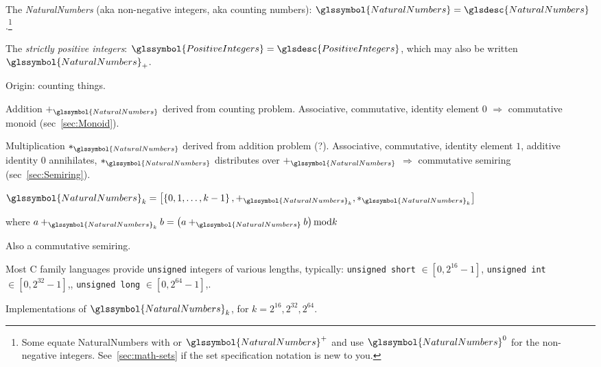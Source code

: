 The \textit{\gls{NaturalNumbers}} 
(aka non-negative integers, aka counting
numbers):\label{NaturalNumbers}
$\glssymbol{NaturalNumbers} = 
\glsdesc{NaturalNumbers}$.\footnote{ 
Some
equate \gls{NaturalNumbers} with  
or $\glssymbol{NaturalNumbers}^{+}$ and use
$\glssymbol{NaturalNumbers}^{0}$ for the non-negative integers. 
See~\autoref{sec:math-sets} if the set specification
notation is new to you.}

The \textit{strictly positive integers}: 
$\glssymbol{PositiveIntegers} = \glsdesc{PositiveIntegers}$, which 
may also be written $\glssymbol{NaturalNumbers}_{+}$.

Origin: counting things.

Addition $+_{\glssymbol{NaturalNumbers}}$ 
derived from counting problem.
Associative, commutative, identity element $0$ $\Rightarrow$ 
commutative monoid (sec~\ref{sec:Monoid}).

Multiplication $*_{\glssymbol{NaturalNumbers}}$
derived from addition problem (?).
Associative, commutative, identity element $1$,
additive identity $0$ annihilates,
$*_{\glssymbol{NaturalNumbers}}$ distributes over 
$+_{\glssymbol{NaturalNumbers}}$ 
 $\Rightarrow$
commutative semiring 
(sec~\ref{sec:Semiring}).



${\glssymbol{NaturalNumbers}}_{k} = 
\left[ \left\{ 0, 1, \ldots, k-1 \right\},
+_{\glssymbol{NaturalNumbers}_{k}},
*_{\glssymbol{NaturalNumbers}_{k}} \right]$

where
$a +_{\glssymbol{NaturalNumbers}_{k}} b =
\left( a +_{\glssymbol{NaturalNumbers}} b \right) \text{mod} k$

Also a commutative semiring.

\label{sec:unsigned-int}

Most C family languages provide \texttt{unsigned} integers
of various lengths, typically: 
\texttt{unsigned short} $\in \left[ 0, 2^{16} - 1 \right]$,
\texttt{unsigned int} $\in \left[ 0, 2^{32} - 1 \right]$,,
\texttt{unsigned long} $\in \left[ 0, 2^{64} - 1 \right]$,.

Implementations of $\glssymbol{NaturalNumbers}_{k}$,
for $k = 2^{16}, 2^{32}, 2^{64}$.

